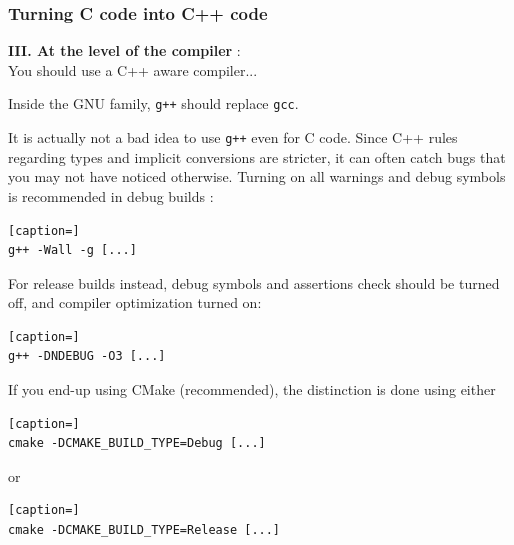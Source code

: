 \documentclass[8pt]{beamer}
\begin{document}
\begin{frame}[containsverbatim]
\frametitle{Turning C code into C++ code}
{\bf III. At the level of the compiler} :\\[3pt]

You should use a C++ aware compiler...

Inside the GNU family, {\tt g++} should replace {\tt gcc}.

\medskip

It is actually not a bad idea to use {\tt g++} even for C code. 
Since C++ rules regarding types and implicit conversions are stricter, it
can often catch bugs that you may not have noticed otherwise. Turning on all warnings
and debug symbols is recommended in debug builds :

\begin{lstlisting}[caption=]
g++ -Wall -g [...]
\end{lstlisting}

For release builds instead, debug symbols and assertions check should be turned
off, and compiler optimization turned on:

\begin{lstlisting}[caption=]
g++ -DNDEBUG -O3 [...]
\end{lstlisting}

\medskip

If you end-up using CMake (recommended), the distinction is done using either 
\begin{lstlisting}[caption=]
cmake -DCMAKE_BUILD_TYPE=Debug [...]
\end{lstlisting}
or
\begin{lstlisting}[caption=]
cmake -DCMAKE_BUILD_TYPE=Release [...]
\end{lstlisting}

\end{frame}
\end{document}
